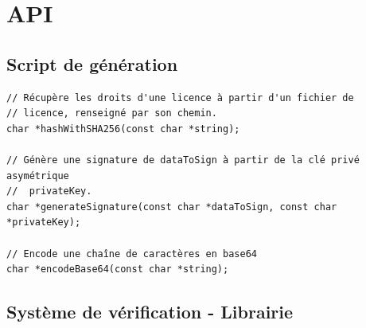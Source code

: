 \section{API}
\subsection{Script de génération}
\label{api:gen}
\begin{verbatim}
// Récupère les droits d'une licence à partir d'un fichier de
// licence, renseigné par son chemin.
char *hashWithSHA256(const char *string);

// Génère une signature de dataToSign à partir de la clé privé asymétrique 
//  privateKey. 
char *generateSignature(const char *dataToSign, const char *privateKey);
  
// Encode une chaîne de caractères en base64
char *encodeBase64(const char *string);
\end{verbatim}

\subsection{Système de vérification - Librairie}
\label{api:lib}
\inputminted{csharp}{lib.cs}

